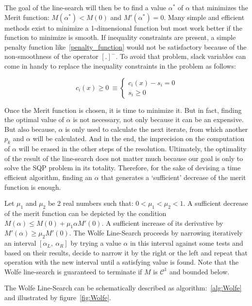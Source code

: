 The goal of the line-search will then be to find a value $\alpha^*$ of $\alpha$ that minimizes the Merit function: $M(\alpha^*) < M(0)$ and $M'(\alpha^*)=0$.
Many simple and efficient methods exist to minimize a 1-dimensional function but most work better if the function to minimize is smooth.
If inequality constraints are present, a simple penalty function like~\ref{penalty_function} would not be satisfactory because of the non-smoothness of the operator ${[.]}^-$.
To avoid that problem, slack variables can come in handy to replace the inequality constraints in the problem as follows:

\begin{equation}
  c_i(x)\geq 0\ \equiv
  \left\{
  \begin{array}{l}
    c_i(x)-s_i=0\\
    s_i\geq 0
  \end{array}
  \right.
\end{equation}

Once the Merit function is chosen, it is time to minimize it.
But in fact, finding the optimal value of $\alpha$ is not necessary, not only because it can be an expensive.
But also because, $\alpha$ is only used to calculate the next iterate, from which another $p_k$ and $\alpha$ will be calculated.
And in the end, the imprecision on the computation of $\alpha$ will be erased in the other steps of the resolution.
Ultimately, the optimality of the result of the line-search does not matter much because our goal is only to solve the SQP problem in its totality.
Therefore, for the sake of devising a time efficient algorithm, finding an $\alpha$ that generates a `sufficient' decrease of the merit function is enough.

Let $\mu_1$ and $\mu_2$ be 2 real numbers such that: $0<\mu_1<\mu_2<1$.
A sufficient decrease of the merit function can be depicted by the condition $M(\alpha) \leq M(0) + \mu_1 \alpha M'(0)$.
A sufficient increase of its derivative by $M'(\alpha)\geq\mu_2 M'(0)$.
The Wolfe Line-Search proceeds by narrowing iteratively an interval $[\alpha_L,\ \alpha_R]$ by trying a value $\alpha$ in this interval against some tests and based on their results, decide to narrow it by the right or the left and repeat that operation with the new interval until a satisfying value is found.
Note that the Wolfe line-search is guaranteed to terminate if $M$ is $\mathcal{C}^1$ and bounded below.

The Wolfe Line-Search can be schematically described as algorithm:~\ref{alg:Wolfe} and illustrated by figure~\ref{fig:Wolfe}.

